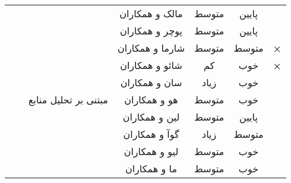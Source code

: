 \begin{table}[]
\begin{tabular}{llccccc}
		&  & \multicolumn{1}{c|}{}                                                                            & \multicolumn{1}{c|}{مالک و همکاران}   & \multicolumn{1}{c|}{متوسط} & \multicolumn{1}{c|}{پایین} & \multicolumn{1}{c|}{\textbf{\checkmark}} \\ \cline{4-7} 
		&  & \multicolumn{1}{c|}{}                                                                            & \multicolumn{1}{c|}{پوچر و همکاران}   & \multicolumn{1}{c|}{متوسط} & \multicolumn{1}{c|}{پایین} & \multicolumn{1}{c|}{\textbf{\checkmark}} \\ \cline{4-7} 
		&  & \multicolumn{1}{c|}{}                                                                            & \multicolumn{1}{c|}{شارما و همکاران}  & \multicolumn{1}{c|}{متوسط} & \multicolumn{1}{c|}{متوسط} & \multicolumn{1}{c|}{\textbf{×}} \\ \cline{3-7} 
		&  & \multicolumn{1}{c|}{}                                                                            & \multicolumn{1}{c|}{شائو و همکاران}   & \multicolumn{1}{c|}{کم}    & \multicolumn{1}{c|}{خوب}   & \multicolumn{1}{c|}{\textbf{×}} \\ \cline{4-7} 
		&  & \multicolumn{1}{c|}{}                                                                            & \multicolumn{1}{c|}{سان و همکاران}    & \multicolumn{1}{c|}{زیاد}  & \multicolumn{1}{c|}{خوب}   & \multicolumn{1}{c|}{\textbf{\checkmark}} \\ \cline{4-7} 
		&  & \multicolumn{1}{c|}{مبتنی بر تحلیل منابع}                                                        & \multicolumn{1}{c|}{هو و همکاران}     & \multicolumn{1}{c|}{متوسط} & \multicolumn{1}{c|}{خوب}   & \multicolumn{1}{c|}{\textbf{\checkmark}} \\ \cline{4-7} 
		&  & \multicolumn{1}{c|}{}                                                                            & \multicolumn{1}{c|}{لین و همکاران}    & \multicolumn{1}{c|}{متوسط} & \multicolumn{1}{c|}{پایین} & \multicolumn{1}{c|}{\textbf{\checkmark}} \\ \cline{4-7} 
		&  & \multicolumn{1}{c|}{}                                                                            & \multicolumn{1}{c|}{گوآ و همکاران}    & \multicolumn{1}{c|}{زیاد}  & \multicolumn{1}{c|}{متوسط} & \multicolumn{1}{c|}{\textbf{\checkmark}} \\ \cline{4-7} 
		&  & \multicolumn{1}{c|}{}                                                                            & \multicolumn{1}{c|}{لیو و همکاران}    & \multicolumn{1}{c|}{متوسط} & \multicolumn{1}{c|}{خوب}   & \multicolumn{1}{c|}{\textbf{\checkmark}} \\ \cline{4-7} 
		&  & \multicolumn{1}{c|}{}                                                                            & \multicolumn{1}{c|}{ما  و همکاران}    & \multicolumn{1}{c|}{متوسط} & \multicolumn{1}{c|}{خوب}   & \multicolumn{1}{c|}{\textbf{\checkmark}} \\ \cline{4-7} 
	\end{tabular}

\end{table}
